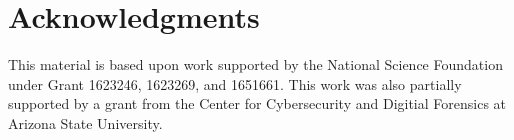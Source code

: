 \section*{Acknowledgments}

This material is based upon work supported by the National Science Foundation under Grant 1623246, 1623269, and 1651661.
This work was also partially supported by a grant from the Center for Cybersecurity and Digitial Forensics at Arizona State University.
